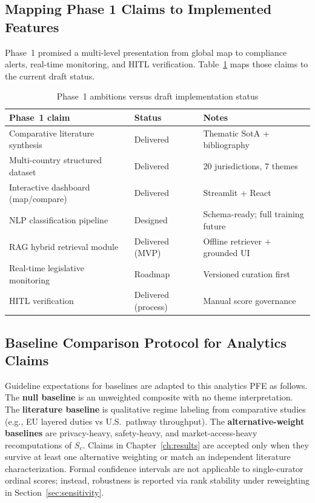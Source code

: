 \subsection{Mapping Phase 1 Claims to Implemented Features}
\label{sec:phase1map}

Phase~1 promised a multi-level presentation from global map to compliance alerts, real-time monitoring, and HITL verification. Table~\ref{tab:phase1map} maps those claims to the current draft status.

\begin{table}[htbp]
\centering
\caption{Phase~1 ambitions versus draft implementation status}
\label{tab:phase1map}
\begin{tabular}{@{}p{4.2cm}p{3.0cm}p{4.0cm}@{}}
\toprule
\textbf{Phase~1 claim} & \textbf{Status} & \textbf{Notes} \\
\midrule
Comparative literature synthesis & Delivered & Thematic SotA + bibliography \\
Multi-country structured dataset & Delivered & 20 jurisdictions, 7 themes \\
Interactive dashboard (map/compare) & Delivered & Streamlit + React \\
NLP classification pipeline & Designed & Schema-ready; full training future \\
RAG hybrid retrieval module & Delivered (MVP) & Offline retriever + grounded UI \\
Real-time legislative monitoring & Roadmap & Versioned curation first \\
HITL verification & Delivered (process) & Manual score governance \\
\bottomrule
\end{tabular}
\end{table}

\subsection{Baseline Comparison Protocol for Analytics Claims}
\label{sec:baselineproto}

Guideline expectations for baselines are adapted to this analytics PFE as follows. The \textbf{null baseline} is an unweighted composite with no theme interpretation. The \textbf{literature baseline} is qualitative regime labeling from comparative studies (e.g., EU layered duties vs U.S.\ pathway throughput). The \textbf{alternative-weight baselines} are privacy-heavy, safety-heavy, and market-access-heavy recomputations of $S_c$. Claims in Chapter~\ref{ch:results} are accepted only when they survive at least one alternative weighting or match an independent literature characterization. Formal confidence intervals are not applicable to single-curator ordinal scores; instead, robustness is reported via rank stability under reweighting in Section~\ref{sec:sensitivity}.

